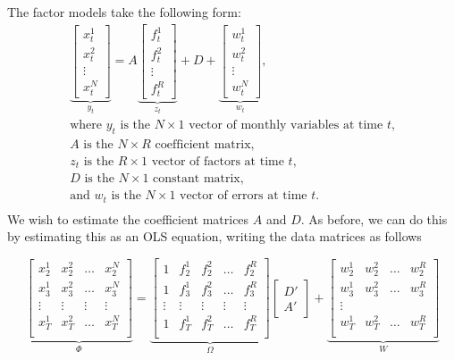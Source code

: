 \documentclass[11pt, letterpaper]{article}\usepackage[]{graphicx}\usepackage[]{color}
\begin{document}
The factor models take the following form:
\begin{align*}
\underbrace{\begin{bmatrix}
	x^1_t\\
	x^2_t\\
	\vdots \\
	x^N_t
\end{bmatrix}}_{y_t}
=
A
\underbrace{\begin{bmatrix}
	f^1_{t}\\
	f^2_{t}\\
	\vdots \\
	f^R_{t}
\end{bmatrix}}_{z_t}
+
D 
+
\underbrace{\begin{bmatrix}
	w^1_t\\
	w^2_t\\
	\vdots\\
	w^N_t
\end{bmatrix}}_{w_t},\\
\text{where $y_t$ is the $N \times 1$ vector of monthly variables at time $t$,}\\
\text{$A$ is the $N \times R$ coefficient matrix,}\\
\text{$z_t$ is the $R \times 1$ vector of factors at time $t$,}\\
\text{$D$ is the $N \times 1$ constant matrix,}\\
\text{and $w_t$ is the $N \times 1$ vector of errors at time $t$.}\\
\end{align*}
We wish to estimate the coefficient matrices $A$ and $D$. As before, we can do this by estimating this as an OLS equation, writing the data matrices as follows

\begin{equation}
\underbrace{\begin{bmatrix}
x^1_{2} & x^2_{2} & \dots & x^N_{2}\\
x^1_{3} & x^2_{3} & \dots & x^N_{3}\\
\vdots & \vdots & \vdots & \vdots \\
x^1_{T} & x^2_{T} & \dots & x^N_{T}\\
\end{bmatrix}}_{\Phi}
=
\underbrace{\begin{bmatrix}
1 & f^1_{2} & f^2_{2} & \dots & f^R_{2}\\
1 & f^1_{3} & f^2_{3} & \dots & f^R_{3}\\
\vdots & \vdots & \vdots & \vdots & \vdots \\
1 & f^1_{T} & f^2_{T} & \dots & f^R_{T}\\
\end{bmatrix}}_{\Omega}
\begin{bmatrix}
D'\\
A'
\end{bmatrix}
 +
\underbrace{\begin{bmatrix}
w^1_2 & w^2_2 & \dots & w^R_2\\
w^1_3 & w^2_3 & \dots & w^R_3\\
\vdots\\
w^1_T & w^2_T & \dots & w^R_T\\
\end{bmatrix}}_{W}
\end{equation}
\end{document}
